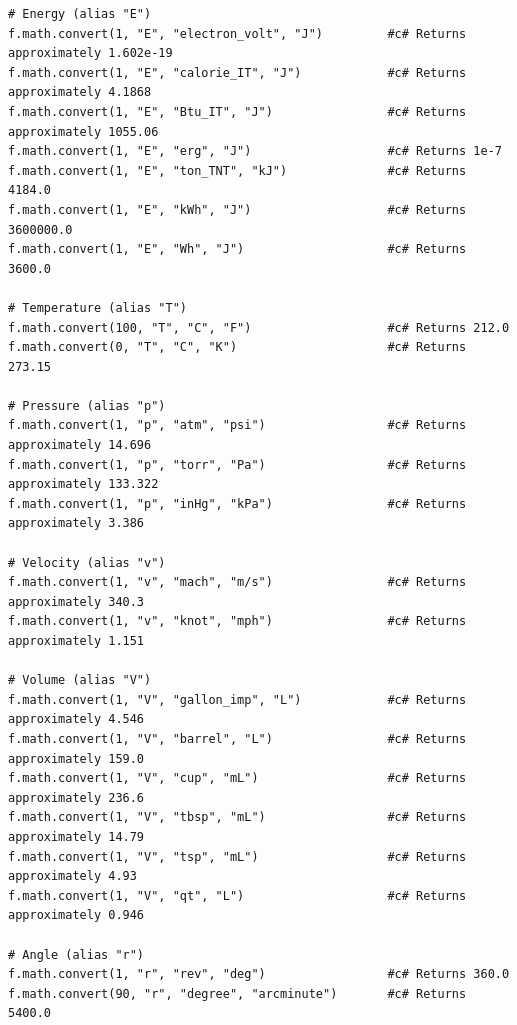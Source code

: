 \begin{verbatim}
# Energy (alias "E")
f.math.convert(1, "E", "electron_volt", "J")         #c# Returns approximately 1.602e-19
f.math.convert(1, "E", "calorie_IT", "J")            #c# Returns approximately 4.1868
f.math.convert(1, "E", "Btu_IT", "J")                #c# Returns approximately 1055.06
f.math.convert(1, "E", "erg", "J")                   #c# Returns 1e-7
f.math.convert(1, "E", "ton_TNT", "kJ")              #c# Returns 4184.0
f.math.convert(1, "E", "kWh", "J")                   #c# Returns 3600000.0
f.math.convert(1, "E", "Wh", "J")                    #c# Returns 3600.0

# Temperature (alias "T")
f.math.convert(100, "T", "C", "F")                   #c# Returns 212.0
f.math.convert(0, "T", "C", "K")                     #c# Returns 273.15

# Pressure (alias "p")
f.math.convert(1, "p", "atm", "psi")                 #c# Returns approximately 14.696
f.math.convert(1, "p", "torr", "Pa")                 #c# Returns approximately 133.322
f.math.convert(1, "p", "inHg", "kPa")                #c# Returns approximately 3.386

# Velocity (alias "v")
f.math.convert(1, "v", "mach", "m/s")                #c# Returns approximately 340.3
f.math.convert(1, "v", "knot", "mph")                #c# Returns approximately 1.151

# Volume (alias "V")
f.math.convert(1, "V", "gallon_imp", "L")            #c# Returns approximately 4.546
f.math.convert(1, "V", "barrel", "L")                #c# Returns approximately 159.0
f.math.convert(1, "V", "cup", "mL")                  #c# Returns approximately 236.6
f.math.convert(1, "V", "tbsp", "mL")                 #c# Returns approximately 14.79
f.math.convert(1, "V", "tsp", "mL")                  #c# Returns approximately 4.93
f.math.convert(1, "V", "qt", "L")                    #c# Returns approximately 0.946

# Angle (alias "r")
f.math.convert(1, "r", "rev", "deg")                 #c# Returns 360.0
f.math.convert(90, "r", "degree", "arcminute")       #c# Returns 5400.0
\end{verbatim}

